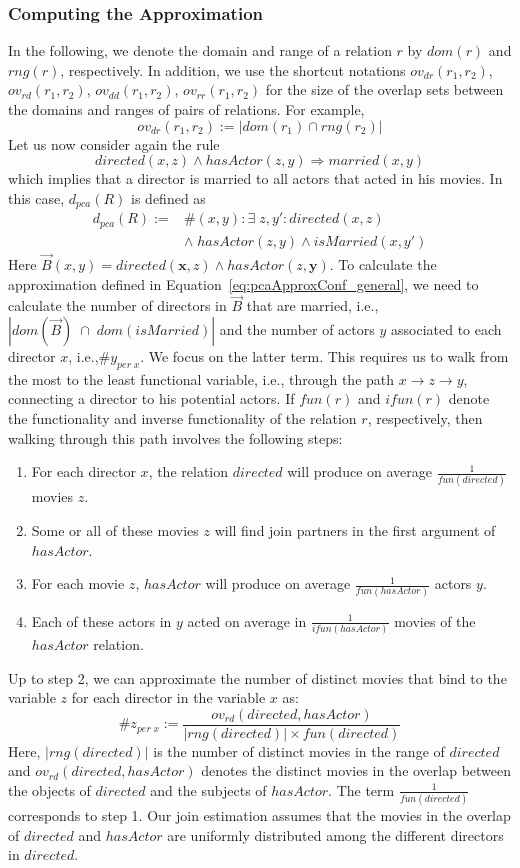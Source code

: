\subsubsection{Computing the Approximation} \label{sec:appr}
In the following, we denote the domain and range of a relation $r$ by $dom(r)$ and $rng(r)$, respectively.
In addition, we use the shortcut notations $ov_{dr}(r_1,r_2)$, $ov_{rd}(r_1,r_2)$, $ov_{dd}(r_1,r_2)$, $ov_{rr}(r_1,r_2)$
for the size of the overlap sets between the domains and ranges 
of pairs of relations. For example, \[ov_{dr}(r_1,r_2) := |dom(r_1) \cap rng(r_2)|\]
Let us now consider again the rule
\[
 directed(x,z) \wedge hasActor(z,y) \Rightarrow married(x,y)
\]
which implies that a director is married to all actors that acted in his movies.
In this case, $d_{pca}(R)$ is defined as
\[
\begin{array}{rl}
d_{pca}(R) := &\#(x,y): \exists\; z, y': directed(x,z)  \\
  &\wedge\; hasActor(z,y) \wedge isMarried(x,y') \label{eq:denomPCAExample}
\end{array}
\]
Here $\vec{B}(x, y) = directed(\bm{x},z) \wedge hasActor(z,\bm{y})$.
To calculate the approximation defined in Equation~\ref{eq:pcaApproxConf_general}, 
we need to calculate the number of directors in $\vec{B}$ that are married, i.e.,  
$|dom(\vec{B})\;\cap\;dom(isMarried)|$ and the number of actors $y$ 
associated to each director $x$, i.e.,$\#y_{per\;x}$.
We focus on the latter term. 
This requires us to walk from the most to the least functional variable, i.e., through the path $x \rightarrow z \rightarrow y$, connecting a director to his potential actors. 
If $fun(r)$ and $ifun(r)$
denote the functionality and inverse functionality of the relation $r$, respectively, then
walking through this path involves the following steps:
\begin{enumerate} \itemsep +0.3ex
 \item For each director $x$, the relation $directed$ will produce on average $\frac{1}{fun(directed)}$ movies $z$.
 \item Some or all of these movies $z$ will find join partners in the first argument of $hasActor$.
 \item For each movie $z$, $hasActor$ will produce on average $\frac{1}{fun(hasActor)}$ actors $y$.
 \item Each of these actors in $y$ acted on average in  $\frac{1}{ifun(hasActor)}$ movies of the $hasActor$ relation.
\end{enumerate}
Up to step 2, we can approximate the number of distinct movies that bind to the variable $z$ for each director in the variable $x$ as:
$$
\#z_{per \; x} := \frac{ ov_{rd}(directed,hasActor) }{|rng(directed)| \times fun(directed)}
$$
Here, $|rng(directed)|$ is the number of distinct movies in the range of $directed$ and $ov_{rd}(directed,hasActor)$ 
denotes the distinct movies in the overlap between the objects of $directed$ and the subjects of $hasActor$.
The term $\frac{1}{fun(directed)}$ corresponds to step  1.
Our join estimation assumes that the movies in the overlap of $directed$ 
and $hasActor$ are uniformly distributed among the different directors in $directed$.

